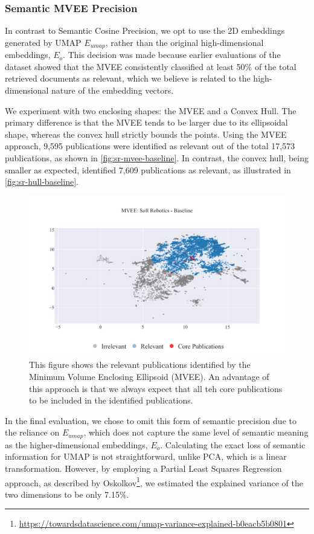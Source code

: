 \subsubsection{Semantic MVEE Precision}

In contrast to Semantic Cosine Precision, we opt to use the 2D embeddings generated by UMAP $E_{umap}$, rather than the original high-dimensional embeddings, $E_o$. This decision was made because earlier evaluations of the dataset showed that the MVEE consistently classified at least 50\% of the total retrieved documents as relevant, which we believe is related to the high-dimensional nature of the embedding vectors.

We experiment with two enclosing shapes: the MVEE and a Convex Hull. The primary difference is that the MVEE tends to be larger due to its ellipsoidal shape, whereas the convex hull strictly bounds the points. Using the MVEE approach, 9,595 publications were identified as relevant out of the total 17,573 publications, as shown in \autoref{fig:sr-mvee-baseline}. In contrast, the convex hull, being smaller as expected, identified 7,609 publications as relevant, as illustrated in \autoref{fig:sr-hull-baseline}.

\begin{figure}
	\centering	
	\includegraphics[scale=0.6]{pics/sr-mvee-baseline.pdf}
	\caption[Semantic MVEE: Soft Robotics]{This figure shows the relevant publications identified by the Minimum Volume Enclosing Ellipsoid (MVEE). An advantage of this approach is that we always expect that all teh core publications to be included in the identified publications.}\label{fig:sr-mvee-baseline}
\end{figure}

In the final evaluation, we chose to omit this form of semantic precision due to the reliance on $E_{umap}$, which does not capture the same level of semantic meaning as the higher-dimensional embeddings, $E_o$. Calculating the exact loss of semantic information for UMAP is not straightforward, unlike PCA, which is a linear transformation. However, by employing a Partial Least Squares Regression approach, as described by Oskolkov\footnote{\url{https://towardsdatascience.com/umap-variance-explained-b0eacb5b0801}}, we estimated the explained variance of the two dimensions to be only 7.15\%.

